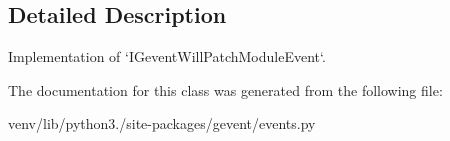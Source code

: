\subsection{Detailed Description}
\begin{DoxyVerb}Implementation of `IGeventWillPatchModuleEvent`.
\end{DoxyVerb}
 

The documentation for this class was generated from the following file\+:\begin{DoxyCompactItemize}
\item 
venv/lib/python3./site-\/packages/gevent/events.\+py\end{DoxyCompactItemize}
